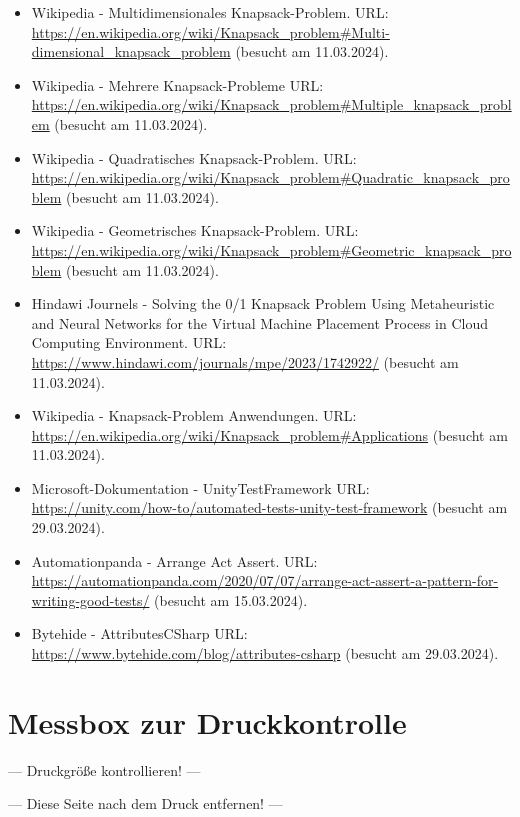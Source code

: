 \begin{itemize}[leftmargin=0pt]
    \item Wikipedia - Multidimensionales Knapsack-Problem. {\scriptsize URL:} \url{https://en.wikipedia.org/wiki/Knapsack_problem#Multi-dimensional_knapsack_problem} (besucht am 11.03.2024).
    \item Wikipedia - Mehrere Knapsack-Probleme {\scriptsize URL:} \url{https://en.wikipedia.org/wiki/Knapsack_problem#Multiple_knapsack_problem} (besucht am 11.03.2024).
    \item Wikipedia - Quadratisches Knapsack-Problem. {\scriptsize URL:} \url{https://en.wikipedia.org/wiki/Knapsack_problem#Quadratic_knapsack_problem} (besucht am 11.03.2024).
    \item Wikipedia - Geometrisches Knapsack-Problem. {\scriptsize URL:} \url{https://en.wikipedia.org/wiki/Knapsack_problem#Geometric_knapsack_problem} (besucht am 11.03.2024).
    \item Hindawi Journels - Solving the 0/1 Knapsack Problem Using Metaheuristic and Neural Networks for the Virtual Machine Placement Process in Cloud Computing Environment. {\scriptsize URL:} \url{https://www.hindawi.com/journals/mpe/2023/1742922/} (besucht am 11.03.2024).
    \item Wikipedia - Knapsack-Problem Anwendungen. {\scriptsize URL:} \url{https://en.wikipedia.org/wiki/Knapsack_problem#Applications} (besucht am 11.03.2024).
    \item Microsoft-Dokumentation - UnityTestFramework {\scriptsize URL:} \url{https://unity.com/how-to/automated-tests-unity-test-framework} (besucht am 29.03.2024).
    \item Automationpanda - Arrange Act Assert. {\scriptsize URL:} \url{https://automationpanda.com/2020/07/07/arrange-act-assert-a-pattern-for-writing-good-tests/} (besucht am 15.03.2024).
    \item Bytehide - AttributesCSharp {\scriptsize URL:} \url{https://www.bytehide.com/blog/attributes-csharp} (besucht am 29.03.2024).
\end{itemize}

\newpage

\chapter*{Messbox zur Druckkontrolle}

\begin{center}
{\Large --- Druckgröße kontrollieren! ---}

    \bigskip


    \bigskip

    {\Large --- Diese Seite nach dem Druck entfernen! ---}

\end{center}